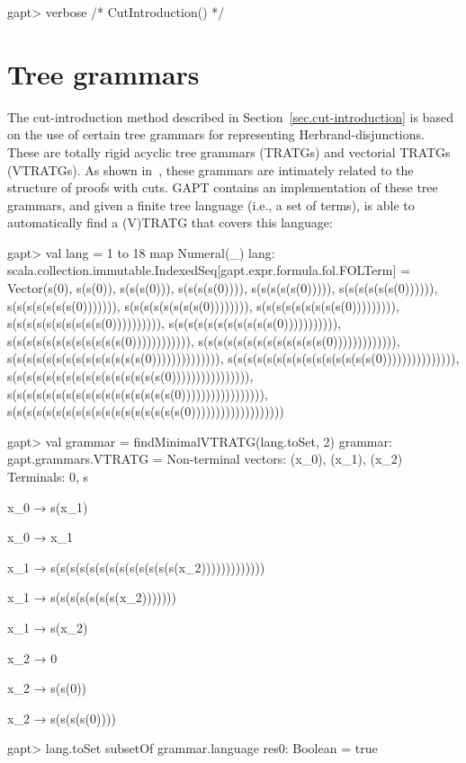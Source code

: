 \documentclass[a4paper,11pt]{book}
\begin{document}
\begin{clilisting}
gapt> verbose { /* CutIntroduction() */ }

\end{clilisting}

\section{Tree grammars}

The cut-introduction method described in Section~\ref{sec.cut-introduction} is
based on the use of certain tree grammars for representing Herbrand-disjunctions.
These are totally rigid acyclic tree grammars (TRATGs) and vectorial TRATGs (VTRATGs).
As shown in~\cite{Hetzl14Algorithmic}, these grammars are intimately related to
the structure of proofs with cuts.  GAPT contains an implementation of
these tree grammars, and given a finite tree language (i.e., a set of terms), is
able to automatically find a (V)TRATG that covers this language:

\begin{clilisting}
gapt> val lang = 1 to 18 map { Numeral(_) }
lang: scala.collection.immutable.IndexedSeq[gapt.expr.formula.fol.FOLTerm] = Vector(s(0), s(s(0)), s(s(s(0))), s(s(s(s(0)))), s(s(s(s(s(0))))), s(s(s(s(s(s(0)))))), s(s(s(s(s(s(s(0))))))), s(s(s(s(s(s(s(s(0)))))))), s(s(s(s(s(s(s(s(s(0))))))))), s(s(s(s(s(s(s(s(s(s(0)))))))))), s(s(s(s(s(s(s(s(s(s(s(0))))))))))), s(s(s(s(s(s(s(s(s(s(s(s(0)))))))))))), s(s(s(s(s(s(s(s(s(s(s(s(s(0))))))))))))), s(s(s(s(s(s(s(s(s(s(s(s(s(s(0)))))))))))))), s(s(s(s(s(s(s(s(s(s(s(s(s(s(s(0))))))))))))))), s(s(s(s(s(s(s(s(s(s(s(s(s(s(s(s(0)))))))))))))))), s(s(s(s(s(s(s(s(s(s(s(s(s(s(s(s(s(0))))))))))))))))), s(s(s(s(s(s(s(s(s(s(s(s(s(s(s(s(s(s(0)))))))))))))))))))

gapt> val grammar = findMinimalVTRATG(lang.toSet, 2)
grammar: gapt.grammars.VTRATG =
Non-terminal vectors: (x_0), (x_1), (x_2)
Terminals: 0, s

x_0 → s(x_1)

x_0 → x_1

x_1 → s(s(s(s(s(s(s(s(s(s(s(s(s(x_2)))))))))))))

x_1 → s(s(s(s(s(s(s(x_2)))))))

x_1 → s(x_2)

x_2 → 0

x_2 → s(s(0))

x_2 → s(s(s(s(0))))

gapt> lang.toSet subsetOf grammar.language
res0: Boolean = true

\end{clilisting}
\end{document}
